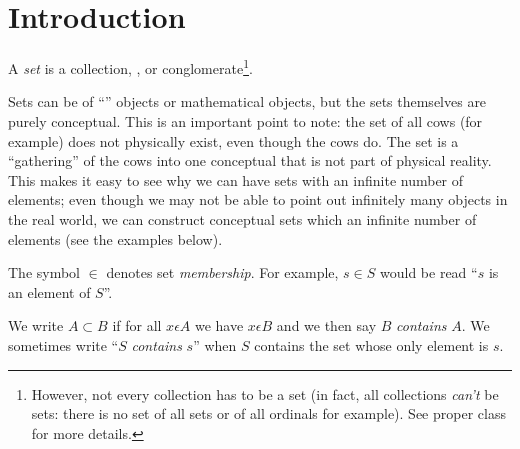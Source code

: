 \documentclass[12pt]{article}
\begin{document}

\section{Introduction}

A \emph{set} is a collection, , or conglomerate\footnote{However, not every collection has to be a set (in fact, all collections \emph{can't} be sets: there is no set of all sets or of all ordinals for example). See proper class for more details.}.

Sets can be of ``'' objects or mathematical objects, but the sets themselves are purely conceptual. This is an important point to note: the set of all cows (for example) does not physically exist, even though the cows do. The set is a ``gathering'' of the cows into one conceptual  that is not part of physical reality. This makes it easy to see why we can have sets with an infinite number of elements; even though we may not be able to point out infinitely many objects in the real world, we can construct conceptual sets which an infinite number of elements (see the examples below).

The symbol $\in$ denotes set \emph{membership}. For example, \( s \in S \) would be read ``$s$ is an element of $S$''.


We write  $A \subset B$ if for all $x \epsilon A$ we have $x \epsilon B$
and we then say $B$ \emph{contains} $A$.
We sometimes write 
 ``$S$ \emph{contains} $s$'' when $S$ contains the 
set whose only element is $s$. %
\end{document}
